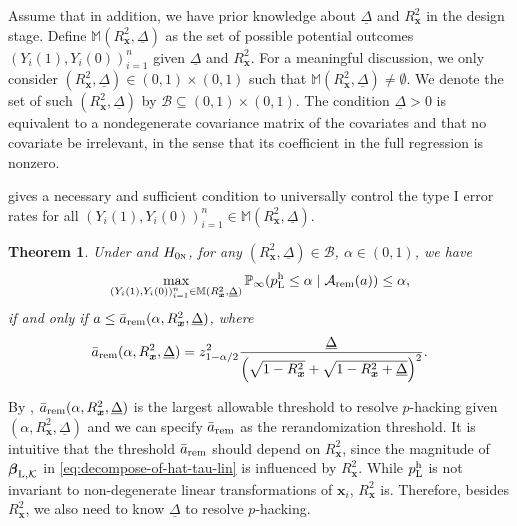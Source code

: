 \documentclass[12pt]{article}
\newtheorem{theorem}{Theorem}
\newcommand{\Lin}{\textnormal{L}}
\newcommand{\Prob}{\mathbb{P}}
\newcommand{\mk}{\mathcal{K}}
\newcommand{\ma}{\mathcal{A}}
\newcommand{\rem}{\textnormal{rem}}
\newcommand{\bs}{\boldsymbol}
\newcommand{\hpL}{p_\textnormal{L}^{\textnormal{h}}}
\newcommand{\lx}[1]{#1}
\begin{document}
  Assume that in addition, we have prior knowledge about  $\underline{\Delta}$ and $R^2_{\bs{x}}$ in the design stage. Define $\mathbb{M}(R^2_{\bs{x}}, \underline{\Delta})$ as the set of possible potential outcomes $(Y_i(1), Y_i(0))_{i=1}^n$ given $\underline{\Delta}$ and $R^2_{\bs{x}}$. For a meaningful discussion, we only consider $(R^2_{\bs{x}},\underline{\Delta}) \in (0,1)\times (0,1)$ such that $\mathbb{M}(R^2_{\bs{x}}, \underline{\Delta})\ne \emptyset$. We denote the set of such $(R^2_{\bs{x}},\underline{\Delta})$ by $\mathcal{B} \subseteq (0,1)\times (0,1)$.
  \lx{The condition $\underline{\Delta} >0$ is equivalent to a
nondegenerate covariance matrix of the covariates and that no covariate be
irrelevant, in the sense that its coefficient in the full regression is
nonzero.}

   gives a necessary and sufficient condition to universally control the type I error rates for all $(Y_i(1),Y_i(0))_{i=1}^n \in \mathbb{M}(R^2_{\bs{x}}, \underline{\Delta})$.

\begin{theorem}
\label{thm:iff-for-rem_control-TIE}
Under  and $H_{0\textsc{n}}$, for any $(R^2_{\bs{x}},\underline{\Delta})\in \mathcal{B}$, $\alpha \in (0,1)$, we have
\begin{align*}
\max_{(Y_i(1),Y_i(0))_{i=1}^n\in\mathbb{M}(R^2_{\bs{x}},\underline{\Delta})}\Prob_{\infty}( \hpL \leq \alpha\mid \ma_{\rem}(a)) \leq \alpha,
\end{align*}
if and only if $a \leq \bar{a}_{\rem}(\alpha,R^2_{\bs{x}}, \underline{\Delta})$, where
    \begin{align}
    \label{eq:bound-for-ReM}
     \bar{a}_{\rem}(\alpha,R^2_{\bs{x}}, \underline{\Delta}) =  z_{1-\alpha/2}^2\frac{\underline{\Delta}}{\Big(\sqrt{1-R^2_{\bs{x}}}+\sqrt{1-R^2_{\bs{x}}+ \underline{\Delta}}  \Big)^2}.
    \end{align}
\end{theorem}



By , $\bar{a}_{\rem}(\alpha, R^2_{\bs{x}},\underline{\Delta})$ is the largest allowable threshold to resolve $p$-hacking given $(\alpha, R^2_{\bs{x}},\underline{\Delta})$ and we can specify $\bar{a}_{\rem}$ as the rerandomization threshold. It is intuitive that the threshold $\bar{a}_{\rem}$ should depend on $R^2_{\bs{x}}$, since the magnitude of $\bs{\beta}_{\Lin,\mk}$ in \eqref{eq:decompose-of-hat-tau-lin} is influenced by $R^2_{\bs{x}}$.  While $\hpL$ is not invariant to non-degenerate linear transformations of $\bs{x}_i$, $R^2_{\bs{x}}$ is. Therefore, besides $R^2_{\bs{x}}$, we also need to know $\underline{\Delta}$ to resolve $p$-hacking.
\end{document}
